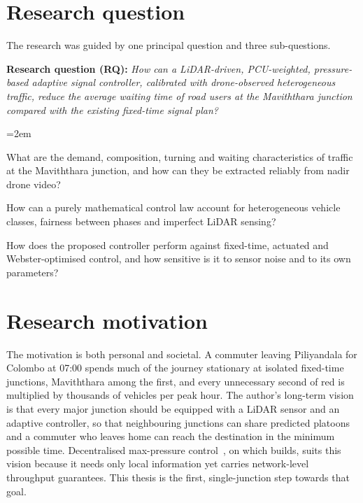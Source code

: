 \section{Research question}\label{sec:intro-rq}

The research was guided by one principal question and three sub-questions.

\textbf{Research question (RQ):} \emph{How can a LiDAR-driven, PCU-weighted, pressure-based adaptive signal controller, calibrated with drone-observed heterogeneous traffic, reduce the average waiting time of road users at the Maviththara junction compared with the existing fixed-time signal plan?}

{\emergencystretch=2em\begin{description}[leftmargin=1.7cm, labelwidth=1.3cm, labelsep=0.4cm, itemsep=2pt]
  \item[SRQ1] What are the demand, composition, turning and waiting characteristics of traffic at the Maviththara junction, and how can they be extracted reliably from nadir drone video?
  \item[SRQ2] How can a purely mathematical control law account for heterogeneous vehicle classes, fairness between phases and imperfect LiDAR sensing?
  \item[SRQ3] How does the proposed controller perform against fixed-time, actuated and Webster-optimised control, and how sensitive is it to sensor noise and to its own parameters?
\end{description}}

\section{Research motivation}\label{sec:intro-motivation}

The motivation is both personal and societal. A commuter leaving Piliyandala for Colombo at 07:00 spends much of the journey stationary at isolated fixed-time junctions, Maviththara among the first, and every unnecessary second of red is multiplied by thousands of vehicles per peak hour. The author's long-term vision is that every major junction should be equipped with a LiDAR sensor and an adaptive controller, so that neighbouring junctions can share predicted platoons and a commuter who leaves home can reach the destination in the minimum possible time. Decentralised max-pressure control~\cite{varaiya2013maxpressure}, on which \prism{} builds, suits this vision because it needs only local information yet carries network-level throughput guarantees. This thesis is the first, single-junction step towards that goal.

